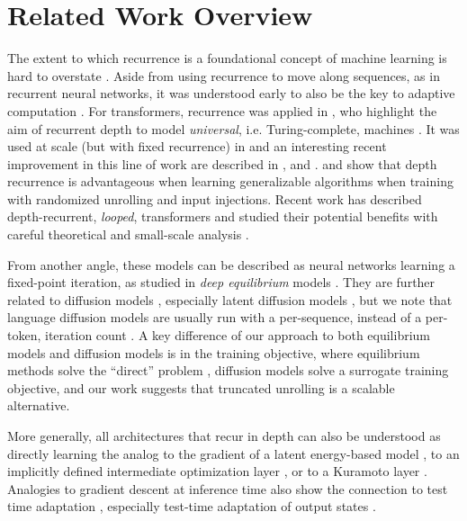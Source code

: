 \section{Related Work Overview}
The extent to which recurrence is a foundational concept of machine learning is hard to overstate \citep{amari_learning_1972,hopfield_neural_1982,braitenberg_vehicles_1986,gers_recurrent_2000,sutskever_recurrent_2008}. Aside from using recurrence to move along sequences, as in recurrent neural networks, it was understood early to also be the key to adaptive computation \citep{schmidhuber_self-delimiting_2012,graves_adaptive_2017}. For transformers, recurrence was applied in \citet{dehghani_universal_2019}, who highlight the aim of recurrent depth to model \textit{universal}, i.e. Turing-complete, machines \citep{graves_neural_2014}. It was used at scale (but with fixed recurrence) in \citet{lan_albert_2019} and an interesting recent improvement in this line of work are described in \citet{tan_sparse_2023,abnar_adaptivity_2023}, \citet{mathur_mind_2024} and \citet{csordas_moeut_2024}. \citet{schwarzschild_can_2021,bansal_end--end_2022,bear_rethinking_2024} and \citet{mcleish_transformers_2024} show that depth recurrence is advantageous when learning generalizable algorithms when training with randomized unrolling and input injections. Recent work has described depth-recurrent, \textit{looped}, transformers and studied their potential benefits with careful theoretical and small-scale analysis \citep{giannou_looped_2023,gatmiry_can_2024,yang_looped_2024,fan_looped_2025}.

From another angle, these models can be described as neural networks learning a fixed-point iteration, as studied in \textit{deep equilibrium} models \citep{bai_deep_2019,bai_neural_2022}. They are further related to diffusion models \citep{song_generative_2019}, especially latent diffusion models \citep{rombach_high-resolution_2022}, but we note that language diffusion models are usually run with a per-sequence, instead of a per-token, iteration count \citep{lee_deterministic_2018}. A key difference of our approach to both equilibrium models and diffusion models is in the training objective, where equilibrium methods solve the ``direct'' problem \citep{geiping_parametric_2019-1}, diffusion models solve a surrogate training objective, and our work suggests that truncated unrolling is a scalable alternative.

More generally, all architectures that recur in depth can also be understood as directly learning the analog to the gradient of a latent energy-based model \citep{lecun_loss_2005,lecun_path_2022}, to an implicitly defined intermediate optimization layer \citep{amos_optnet:_2017}, or to a Kuramoto layer \citep{miyato_artificial_2024}. Analogies to gradient descent at inference time also show the connection to test time adaptation \citep{sun_test-time_2020}, especially test-time adaptation of output states \citep{boudiaf_parameter-free_2022}.

